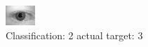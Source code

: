 \begin{figure}[h!]
\begin{center}
\includegraphics[width=0.60\columnwidth]{figures/ID621_class_2_target_3.png}
\end{center}
\caption{ Classification: 2 actual target: 3}
\label{fig:ID621_class_2_target_3}
\end{figure}
